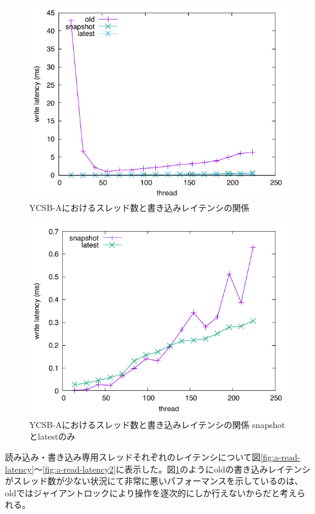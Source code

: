 \documentclass[a4paper]{jreport}	%
\begin{document}
\begin{figure}[h] 
\centering
\includegraphics[width=15cm]{ycsb-a/opposite-write-latency}
\caption{YCSB-Aにおけるスレッド数と書き込みレイテンシの関係}
\label{fig:a-write-latency}
\end{figure}

\begin{figure}[h] 
\centering
\includegraphics[width=15cm]{ycsb-a/opposite-write-latency2}
\caption{YCSB-Aにおけるスレッド数と書き込みレイテンシの関係 snapshotとlatestのみ}
\label{fig:a-write-latency2}
\end{figure}

読み込み・書き込み専用スレッドそれぞれのレイテンシについて図\ref{fig:a-read-latency}〜\ref{fig:a-read-latency2}に表示した。図\ref{fig:a-write-latency}のようにoldの書き込みレイテンシがスレッド数が少ない状況にて非常に悪いパフォーマンスを示しているのは、oldではジャイアントロックにより操作を逐次的にしか行えないからだと考えられる。
\end{document}

